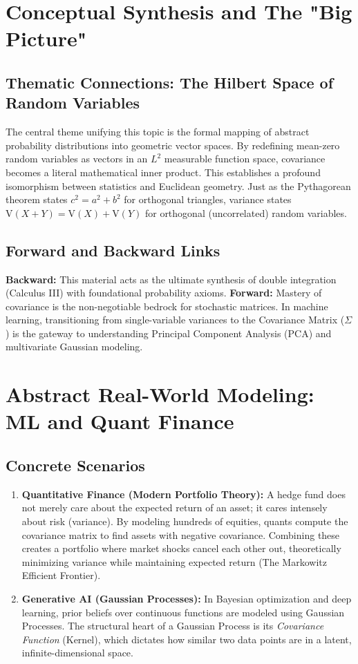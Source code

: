 \documentclass[11pt, a4paper]{article}
\theoremstyle{definition}
\theoremstyle{remark}
\newcommand{\Var}{\mathrm{V}}
\begin{document}
\newpage
\section{Conceptual Synthesis and The "Big Picture"}

\subsection{Thematic Connections: The Hilbert Space of Random Variables}
The central theme unifying this topic is the formal mapping of abstract probability distributions into geometric vector spaces. By redefining mean-zero random variables as vectors in an $L^2$ measurable function space, covariance becomes a literal mathematical inner product. This establishes a profound isomorphism between statistics and Euclidean geometry. Just as the Pythagorean theorem states $c^2 = a^2 + b^2$ for orthogonal triangles, variance states $\Var(X+Y) = \Var(X) + \Var(Y)$ for orthogonal (uncorrelated) random variables.

\subsection{Forward and Backward Links}
\textbf{Backward:} This material acts as the ultimate synthesis of double integration (Calculus III) with foundational probability axioms.
\textbf{Forward:} Mastery of covariance is the non-negotiable bedrock for stochastic matrices. In machine learning, transitioning from single-variable variances to the Covariance Matrix ($\Sigma$) is the gateway to understanding Principal Component Analysis (PCA) and multivariate Gaussian modeling.

\section{Abstract Real-World Modeling: ML and Quant Finance}

\subsection{Concrete Scenarios}
\begin{enumerate}
    \item \textbf{Quantitative Finance (Modern Portfolio Theory):} A hedge fund does not merely care about the expected return of an asset; it cares intensely about risk (variance). By modeling hundreds of equities, quants compute the covariance matrix to find assets with negative covariance. Combining these creates a portfolio where market shocks cancel each other out, theoretically minimizing variance while maintaining expected return (The Markowitz Efficient Frontier).
    \item \textbf{Generative AI (Gaussian Processes):} In Bayesian optimization and deep learning, prior beliefs over continuous functions are modeled using Gaussian Processes. The structural heart of a Gaussian Process is its \textit{Covariance Function} (Kernel), which dictates how similar two data points are in a latent, infinite-dimensional space.
\end{enumerate}
\end{document}
